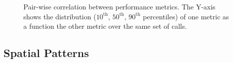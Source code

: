 \begin{figure}[t!]
\centering
{}
\caption{Pair-wise correlation between performance metrics. 
The Y-axis shows the distribution ($10^{\text{th}}$, $50^{\text{th}}$, 
$90^{\text{th}}$ percentiles) of one metric as a function the other 
metric over the same set of calls.}
\label{fig:perf-correlation}
\end{figure}













\subsection{Spatial Patterns}
\label{subsec:measurement:voip:spatial}

